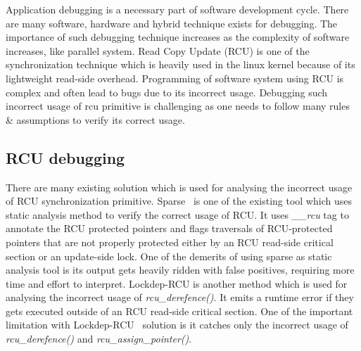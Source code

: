 Application debugging is a necessary part of software development cycle. There are many software, hardware and hybrid technique exists for debugging. The importance of such debugging technique increases as the complexity of software increases, like parallel system. Read Copy Update (RCU) is one of the synchronization technique which is heavily used in the linux kernel because of its lightweight read-side overhead. Programming of software system using RCU is complex and often lead to bugs due to its incorrect usage. Debugging such incorrect usage of rcu primitive is challenging as one needs to follow many rules \& assumptions to verify its correct usage. 

\subsection{RCU debugging}
There are many existing solution which is used for analysing the incorrect usage of RCU synchronization primitive. Sparse~\cite{sparse} is one of the existing tool which uses static analysis method to verify the correct usage of RCU. It uses \emph{\_\_rcu} tag to annotate the RCU protected pointers and flags traversals of RCU-protected pointers that are not properly protected either by an RCU read-side critical section or an update-side lock. One of the demerits of using sparse as static analysis tool is its output gets heavily ridden with false positives, requiring more time and effort to interpret. Lockdep-RCU is another method which is used for analysing the incorrect usage of \emph{rcu\_derefence()}. It emits a runtime error if they gets executed outside of an RCU read-side critical section. One of the important limitation with Lockdep-RCU~\cite{PaulEMcKenney2010LockdepRCU} solution is it catches only the incorrect usage of \emph{rcu\_derefence()} and \emph{rcu\_assign\_pointer()}. 

